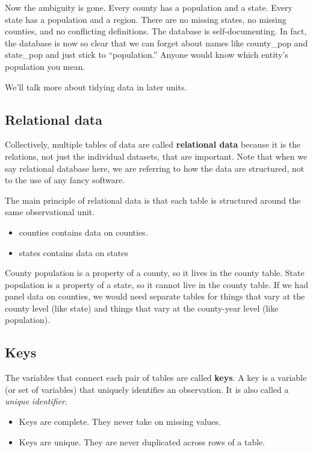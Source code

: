 \documentclass[]{book}
\providecommand{\tightlist}{%
  \setlength{\itemsep}{0pt}\setlength{\parskip}{0pt}}
\begin{document}
Now the ambiguity is gone. Every county has a population and a state.
Every state has a population and a region. There are no missing states,
no missing counties, and no conflicting definitions. The database is
self-documenting. In fact, the database is now so clear that we can
forget about names like county\_pop and state\_pop and just stick to
``population.'' Anyone would know which entity's population you mean.

We'll talk more about tidying data in later units.

\subsection{Relational data}\label{relational-data}

Collectively, multiple tables of data are called \textbf{relational
data} because it is the relations, not just the individual datasets,
that are important. Note that when we say relational database here, we
are referring to how the data are structured, not to the use of any
fancy software.

The main principle of relational data is that each table is structured
around the same observational unit.

\begin{itemize}
\tightlist
\item
  counties contains data on counties.
\item
  states contains data on states
\end{itemize}

County population is a property of a county, so it lives in the county
table. State population is a property of a state, so it cannot live in
the county table. If we had panel data on counties, we would need
separate tables for things that vary at the county level (like state)
and things that vary at the county-year level (like population).

\subsection{Keys}\label{keys}

The variables that connect each pair of tables are called \textbf{keys}.
A key is a variable (or set of variables) that uniquely identifies an
observation. It is also called a \emph{unique identifier}.

\begin{itemize}
\tightlist
\item
  Keys are complete. They never take on missing values.
\item
  Keys are unique. They are never duplicated across rows of a table.
\end{itemize}
\end{document}
